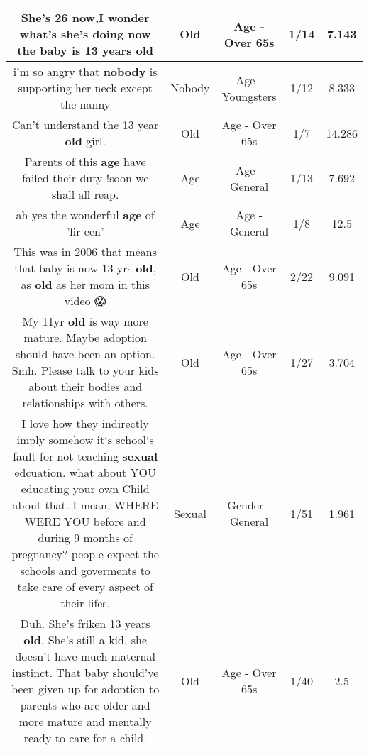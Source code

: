 \documentclass[11pt]{article}
\newlength\mylength
\begin{document}
\begin{center}
\begin{longtable}{|C{.65\mylength}|C{.30\mylength}|C{.12\mylength}|C{.12\mylength}|C{.12\mylength}|}
  \small She's 26 now,I wonder what's she's doing now the baby is 13 years old\normalsize   & Old & Age - Over 65s & 1/14 & 7.143 \\  \hline
  \small i'm so angry that \textbf{nobody} is supporting her neck except the nanny\normalsize   & Nobody & Age - Youngsters & 1/12 & 8.333 \\  \hline
  \small Can't understand the 13 year \textbf{old} girl.\normalsize   & Old & Age - Over 65s & 1/7 & 14.286 \\  \hline
  \small Parents of this \textbf{age} have failed their duty !soon we shall all reap.\normalsize   & Age & Age - General & 1/13 & 7.692 \\  \hline
  \small ah yes the wonderful \textbf{age} of 'fir een'\normalsize   & Age & Age - General & 1/8 & 12.5 \\  \hline
  \small This was in 2006 that means that baby is now 13 yrs \textbf{old}, as \textbf{old} as her mom in this video 😱\normalsize   & Old & Age - Over 65s & 2/22 & 9.091 \\  \hline
  \small My 11yr \textbf{old} is way more mature. Maybe adoption should have been an option. Smh. Please talk to your kids about their bodies and relationships with others.\normalsize   & Old & Age - Over 65s & 1/27 & 3.704 \\  \hline
  \small I love how they indirectly imply somehow it`s school`s fault for not teaching \textbf{sexual} edcuation. what about YOU educating your own Child about that. I mean, WHERE WERE YOU before and during 9 months of pregnancy? people expect the schools and goverments to take care of every aspect of their lifes.\normalsize   & Sexual & Gender - General & 1/51 & 1.961 \\  \hline
  \small Duh. She's friken 13 years \textbf{old}. She's still a kid, she doesn't have much maternal instinct. That baby should've been given up for adoption to parents who are older and more mature and mentally ready to care for a child.\normalsize   & Old & Age - Over 65s & 1/40 & 2.5 \\  \hline

\end{longtable}
\end{center}
\end{document}
